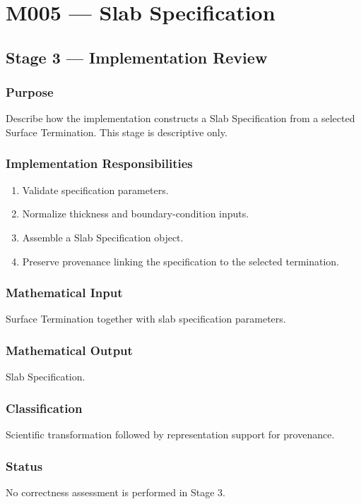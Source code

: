 \chapter{M005 --- Slab Specification}

\section{Stage 3 --- Implementation Review}

\subsection{Purpose}

Describe how the implementation constructs a Slab Specification from a
selected Surface Termination. This stage is descriptive only.

\subsection{Implementation Responsibilities}

\begin{enumerate}
\item Validate specification parameters.
\item Normalize thickness and boundary-condition inputs.
\item Assemble a Slab Specification object.
\item Preserve provenance linking the specification to the selected
termination.
\end{enumerate}

\subsection{Mathematical Input}

Surface Termination together with slab specification parameters.

\subsection{Mathematical Output}

Slab Specification.

\subsection{Classification}

Scientific transformation followed by representation support for
provenance.

\subsection{Status}

No correctness assessment is performed in Stage 3.
